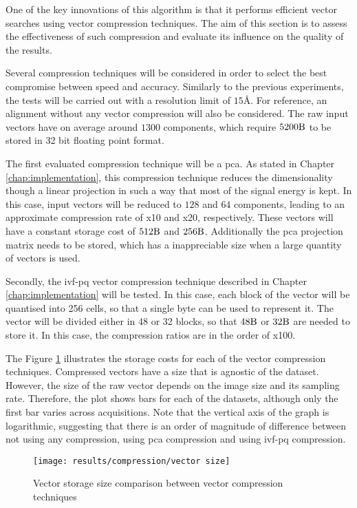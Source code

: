 \documentclass[../main.tex]{subfiles}
\begin{document}
One of the key innovations of this algorithm is that it performs efficient vector searches using vector compression techniques. The aim of this section is to assess the effectiveness of such compression and evaluate its influence on the quality of the results.

Several compression techniques will be considered in order to select the best compromise between speed and accuracy. Similarly to the previous experiments, the tests will be carried out with a resolution limit of $15 \si{\angstrom}$. For reference, an alignment without any vector compression will also be considered. The raw input vectors have on average around $1300$ components, which require $5200 \si{\byte}$ to be stored in 32 bit floating point format.

The first evaluated compression technique will be a \gls{pca}. As stated in Chapter \ref{chap:implementation}, this compression technique reduces the dimensionality though a linear projection in such a way that most of the signal energy is kept. In this case, input vectors will be reduced to $128$ and $64$ components, leading to an approximate compression rate of x10 and x20, respectively. These vectors will have a constant storage cost of $512\si{\byte}$ and $256\si{\byte}$. Additionally the \gls{pca} projection matrix needs to be stored, which has a inappreciable size when a large quantity of vectors is used.

Secondly, the \gls{ivf}-\gls{pq} vector compression technique described in Chapter \ref{chap:implementation} will be tested. In this case, each block of the vector will be quantised into 256 cells, so that a single byte can be used to represent it. The vector will be divided either in 48 or 32 blocks, so that $48\si{\byte}$ or $32\si{\byte}$ are needed to store it. In this case, the compression ratios are in the order of x100.

The Figure \ref{fig:5:vector_size} illustrates the storage costs for each of the vector compression techniques. Compressed vectors have a size that is agnostic of the dataset. However, the size of the raw vector depends on the image size and its sampling rate. Therefore, the plot shows bars for each of the datasets, although only the first bar varies across acquisitions. Note that the vertical axis of the graph is logarithmic, suggesting that there is an order of magnitude of difference between not using any compression, using \gls{pca} compression and using \gls{ivf}-\gls{pq} compression.

\begin{figure}[htbp]
    \centering
    \texttt{[image: results/compression/vector size]}
    \caption{Vector storage size comparison between vector compression techniques}
    \label{fig:5:vector_size}
\end{figure}
\end{document}
